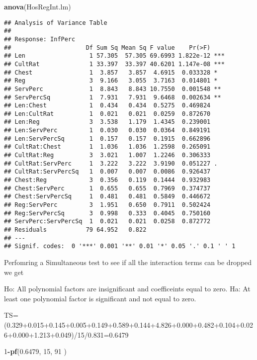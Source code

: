 \documentclass[]{article}
\newenvironment{Shaded}{\begin{snugshade}}{\end{snugshade}}
\newcommand{\KeywordTok}[1]{\textcolor[rgb]{0.13,0.29,0.53}{\textbf{#1}}}
\newcommand{\DecValTok}[1]{\textcolor[rgb]{0.00,0.00,0.81}{#1}}
\newcommand{\FloatTok}[1]{\textcolor[rgb]{0.00,0.00,0.81}{#1}}
\newcommand{\OperatorTok}[1]{\textcolor[rgb]{0.81,0.36,0.00}{\textbf{#1}}}
\newcommand{\NormalTok}[1]{#1}
\begin{document}
\begin{Shaded}
\begin{Highlighting}[]
\KeywordTok{anova}\NormalTok{(HosRegInt.lm)}
\end{Highlighting}
\end{Shaded}

\begin{verbatim}
## Analysis of Variance Table
## 
## Response: InfPerc
##                     Df Sum Sq Mean Sq F value    Pr(>F)    
## Len                  1 57.305  57.305 69.6993 1.822e-12 ***
## CultRat              1 33.397  33.397 40.6201 1.147e-08 ***
## Chest                1  3.857   3.857  4.6915  0.033328 *  
## Reg                  3  9.166   3.055  3.7163  0.014801 *  
## ServPerc             1  8.843   8.843 10.7550  0.001548 ** 
## ServPercSq           1  7.931   7.931  9.6468  0.002634 ** 
## Len:Chest            1  0.434   0.434  0.5275  0.469824    
## Len:CultRat          1  0.021   0.021  0.0259  0.872670    
## Len:Reg              3  3.538   1.179  1.4345  0.239001    
## Len:ServPerc         1  0.030   0.030  0.0364  0.849191    
## Len:ServPercSq       1  0.157   0.157  0.1915  0.662896    
## CultRat:Chest        1  1.036   1.036  1.2598  0.265091    
## CultRat:Reg          3  3.021   1.007  1.2246  0.306333    
## CultRat:ServPerc     1  3.222   3.222  3.9190  0.051227 .  
## CultRat:ServPercSq   1  0.007   0.007  0.0086  0.926437    
## Chest:Reg            3  0.356   0.119  0.1444  0.932983    
## Chest:ServPerc       1  0.655   0.655  0.7969  0.374737    
## Chest:ServPercSq     1  0.481   0.481  0.5849  0.446672    
## Reg:ServPerc         3  1.951   0.650  0.7911  0.502424    
## Reg:ServPercSq       3  0.998   0.333  0.4045  0.750160    
## ServPerc:ServPercSq  1  0.021   0.021  0.0258  0.872772    
## Residuals           79 64.952   0.822                      
## ---
## Signif. codes:  0 '***' 0.001 '**' 0.01 '*' 0.05 '.' 0.1 ' ' 1
\end{verbatim}

Perfomring a Simultaneous test to see if all the interaction terms can
be dropped we get

Ho: All polynomial factors are insignificant and coefficeints equal to
zero. Ha: At least one polynomial factor is significant and not equal to
zero.

TS=
(0.329+0.015+0.145+0.005+0.149+0.589+0.144+4.826+0.000+0.482+0.104+0.026+0.000+1.213+0.049)/15/0.831=0.6479

\begin{Shaded}
\begin{Highlighting}[]
\DecValTok{1}\OperatorTok{-}\KeywordTok{pf}\NormalTok{(}\FloatTok{0.6479}\NormalTok{, }\DecValTok{15}\NormalTok{, }\DecValTok{91}\NormalTok{ )}
\end{Highlighting}
\end{Shaded}
\end{document}
